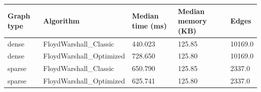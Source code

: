 \begin{tabular}{lllll}
\toprule
Graph type & Algorithm & Median time (ms) & Median memory (KB) & Edges \\
\midrule
dense & FloydWarshall\_Classic & 440.023 & 125.85 & 10169.0 \\
dense & FloydWarshall\_Optimized & 728.650 & 125.80 & 10169.0 \\
sparse & FloydWarshall\_Classic & 650.790 & 125.85 & 2337.0 \\
sparse & FloydWarshall\_Optimized & 625.741 & 125.80 & 2337.0 \\
\bottomrule
\end{tabular}
